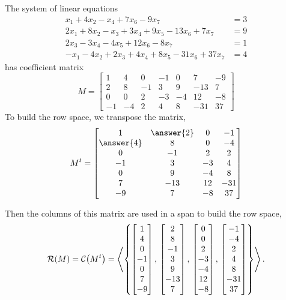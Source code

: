 \documentclass{ximera}
\begin{document}
\begin{example}
  The system of linear equations
  \begin{align*}
    x_1 +4x_2  - x_4  + 7x_6 - 9x_7 &= 3\\
    2x_1 + 8x_2 - x_3 + 3x_4 + 9x_5 - 13x_6 + 7x_7 &= 9\\
    2x_3 -3x_4 -4x_5 +12x_6 -8x_7 &= 1\\
    -x_1  - 4x_2 + 2x_3 +4x_4 + 8x_5 - 31x_6 + 37x_7 &= 4
  \end{align*}
  has coefficient matrix
  \[
    M = \begin{bmatrix}
      1 & 4 & 0 & -1 & 0 & 7 &  -9 \\
      2 & 8 &  -1 & 3 & 9 &  -13 & 7\\
      0 & 0 &  2 & -3 & -4 & 12 &  -8\\
      -1 &  -4 & 2 & 4 & 8 &  -31 & 37
    \end{bmatrix}
  \]
  To build the row space, we transpose the matrix,
  \[
    \transpose{M}=
    \begin{bmatrix}
      1 & \answer{2} & 0 & -1\\
      \answer{4} & 8 & 0 & -4\\
      0 & -1 & 2 & 2\\
      -1 & 3 & -3 & 4\\
      0 & 9 & -4 & 8\\
      7 & -13 & 12 & -31\\
      -9 & 7 & -8 & 37
    \end{bmatrix}
  \]

  Then the columns of this matrix are used in a span to build the row space,
  \[
    \mathcal{R}\!\left(M\right)=\mathcal{C}\!\left(M^{t}\right)=
    \left\langle\left\{
        \begin{bmatrix}1\\4\\0\\-1\\0\\7\\-9\end{bmatrix},\,
        \begin{bmatrix}2\\8\\-1\\3\\9\\-13\\7\end{bmatrix},\,
        \begin{bmatrix}0\\0\\2\\-3\\-4\\12\\-8\end{bmatrix},\,
        \begin{bmatrix}-1\\-4\\2\\4\\8\\-31\\37\end{bmatrix}
      \right\}\right\rangle.
  \]
  

\end{example}
\end{document}
